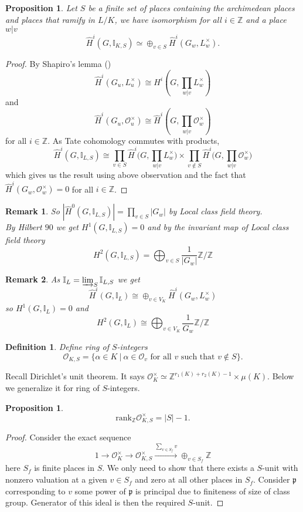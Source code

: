 \documentclass[twoside, 12pt]{iiser-thesis}
\newtheorem{prop}[thm]{ Proposition}
\newtheorem{rem}{Remark}[section]
\newtheorem{defi}{ Definition}[section]
\newcommand{\Z}{\mathbb{Z}}
\newcommand{\I}{\mathbb{I}}
\newcommand{\Ol}{\mathcal{O}}
\newcommand{\x}{\times}
\begin{document}
\begin{prop}
Let $S$ be a finite set of places containing the archimedean places and places that ramify in $L/K$, we have isomorphism for all $i \in \Z$ and a place $w|v$ 
\[ \hat H^i (G, \I _{K,S} ) \simeq \oplus _{v\in S} \hat H^i (G_w,L_w ^\x ) .\]
\end{prop}
\begin{proof}
By Shapiro's lemma () \[ \hat H^i(G_u, L_u ^\x) \cong H^i(G, \prod _{w|v} L_w ^\x) \] and \[ \hat H^i(G_u, \Ol ^\x _u) \cong \hat H^i (G, \prod _{w|v} \Ol ^\x _w) \] for all $i \in \Z$. As Tate cohomology commutes with products, 
\[ \hat H^i (G, \I _{L,S} ) \cong \prod _{v\in S} \hat H^i \Big( G, \prod _{w|v}L^\x _w\Big) \x \prod _{v \not \in S} \hat H^i\Big(G, \prod _{w|v} \Ol ^\x _w\Big) \] which gives us the result using above observation and the fact that $\hat H^i (G_w, \Ol ^\x_w) =0$ for all $i \in \Z $.
\end{proof}
\begin{rem}
So $|\hat H^0 (G,\I _{L,S})| = \prod _{v\in S} |G_w| $ by Local class field theory. \\
By Hilbert $90$  we get $H^1(G, \I _{L,S})=0$ and 
by the invariant map of Local class field theory \[H^2(G, \I _{L,S}) = \bigoplus _{v\in S} \frac{1}{|G_w|}\Z /\Z \]
\end{rem}
\begin{rem}
As $\I _L = \varinjlim _S \I _{L,S}$ we get \[ \hat H^i(G, \I _L)\cong \oplus _{v\in V_K} \hat H^i (G_w, L_w ^\x) \]
so $H^1(G, \I _L) =0$ and \[H^2 (G, \I _L) \cong \bigoplus _{v\in V_K} \frac{1}{G_w} \Z /\Z \]
\end{rem}
\begin{defi}
Define ring of $S$-integers \[\Ol _{K,S} = \{ \alpha \in K \ | \ \alpha \in \Ol _v \text{ for all } v \text{ such that } v\not \in S \} .\]
\end{defi}
Recall Dirichlet's unit theorem. It says $\Ol _K^\x \simeq \Z ^{r_1(K ) + r_2 (K) -1 } \x \mu (K) $. Below we generalize it for ring of $S$-integers.
\begin{prop}
\[ \text{rank}_\Z \Ol ^\x _{K,S} = |S| -1.\]
\end{prop}
\begin{proof}
Consider the exact sequence 
\[1 \rightarrow \Ol _K ^\x \rightarrow \Ol _{K,S} ^\x \xrightarrow{\sum_{v\in S_f} v} \oplus _{v\in S_f} \Z \]
here $S_f$ is finite places in $S$.
We only need to show that there exists a $S$-unit with nonzero valuation at a given $v\in S_f$ and zero at all other places in $S_f$. Consider $\mathfrak p$ corresponding to $v$ some power of $\mathfrak p$ is principal due to finiteness of size of class group. Generator of this ideal is then the required $S$-unit.
\end{proof}
\end{document}
